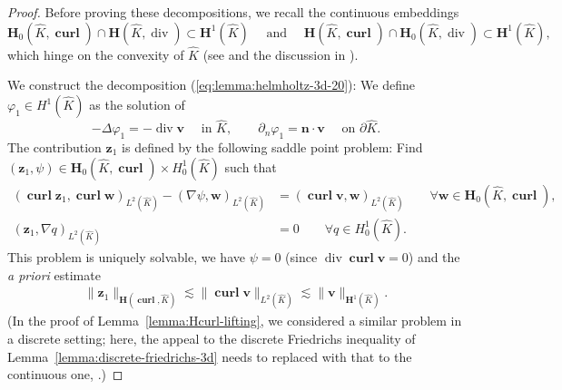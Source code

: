 \documentclass{article}
\begin{document}
\begin{proof}

Before proving these decompositions, we recall the continuous embeddings 
\begin{equation}
\label{eq:saranen}
{\mathbf H}_0(\widehat K,\operatorname{\mathbf{curl}}) \cap {\mathbf H}(\widehat K,\operatorname{div}) \subset {\mathbf H}^1(\widehat K)
\quad \mbox{ and } \quad 
{\mathbf H}(\widehat K,\operatorname{\mathbf{curl}}) \cap {\mathbf H}_0(\widehat K,\operatorname{div}) 
\subset {\mathbf H}^1(\widehat K), 
\end{equation}
which hinge on the convexity of $\widehat K$ (see \cite{birman-solomyak87,saranen82} and the discussion
in \cite[Rem.~{3.48}]{Monkbook}). 


We construct the decomposition (\ref{eq:lemma:helmholtz-3d-20}): 
We define $\varphi_1 \in H^1(\widehat K)$ as the solution of 
$$
-\Delta \varphi_1 = -\operatorname{div} {\mathbf v} \quad \mbox{ in $\widehat K$}, 
\qquad \partial_n \varphi_1 = {\mathbf n} \cdot {\mathbf v} \quad \mbox{ on $\partial \widehat K$.}
$$
The contribution ${\mathbf z}_1$ is defined by the following saddle point problem: 
Find $({\mathbf z}_1, \psi) \in {\mathbf H}_0(\widehat K,\operatorname{\mathbf{curl}}) \times H^1_0(\widehat K)$ 
such that 
\begin{align*}
(\operatorname{\mathbf{curl}} {\mathbf z}_1,
\operatorname{\mathbf{curl}} {\mathbf w})_{L^2(\widehat K)} - (\nabla \psi,{\mathbf w})_{L^2(\widehat K)} & = 
(\operatorname{\mathbf{curl}} {\mathbf v} ,{\mathbf w})_{L^2(\widehat K)} \qquad \forall {\mathbf w} \in {\mathbf H}_0(\widehat K,\operatorname{\mathbf{curl}}),
\\
( {\mathbf z}_1,\nabla q)_{L^2(\widehat K)} &=0 \qquad \forall q \in H^1_0(\widehat K). 
\end{align*}
This problem is uniquely solvable, 
we have $\psi = 0$ (since $\operatorname{div} \operatorname{\mathbf{curl}} {\mathbf v} =0$)
and the {\sl a priori} estimate
\begin{align*}
\|{\mathbf z}_1\|_{{\mathbf H}(\operatorname{\mathbf{curl}},\widehat K)} 
\lesssim \|\operatorname{\mathbf{curl}} {\mathbf v}\|_{L^2(\widehat K)} 
\lesssim \|{\mathbf v}\|_{{\mathbf H}^1(\widehat K)}.
\end{align*}
(In the proof of Lemma~\ref{lemma:Hcurl-lifting}, we considered a similar problem in a discrete setting; here, 
the appeal to the discrete Friedrichs inequality of Lemma~\ref{lemma:discrete-friedrichs-3d} needs to replaced with that to the continuous
one, \cite[Cor.~{3.51}]{Monkbook}.)

\end{proof}
\end{document}
